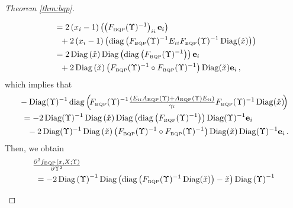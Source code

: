 \documentclass[smallextended]{svjour3hack}       %
\DeclareMathOperator{\Diag}{Diag}
\DeclareMathOperator{\diag}{diag}
\begin{document}
\begin{proof}[Theorem \ref{thm:bqp}]
\begin{itemize}
\begin{align*}
     & ~=2\left(x_i-1\right)\left( \left(F_{{\tiny\mbox{BQP}}}(\Upsilon)^{-1}\right)_{ii} \mathbf{e}_i\right)\\
     & \quad + 2\left(x_i-1\right)\left(\diag\left(F_{{\tiny\mbox{BQP}}}(\Upsilon)^{-1}E_{ii} F_{{\tiny\mbox{BQP}}}(\Upsilon)^{-1}\Diag(\check{x})\right)\right)\\
     & ~=2 \Diag\left(\check{x}\right) \Diag\left(\diag\left(F_{{\tiny\mbox{BQP}}}(\Upsilon)^{-1}\right)\right) \mathbf{e}_i\\
     &  \quad +2 \Diag\left(\check{x}\right)   \left(F_{{\tiny\mbox{BQP}}}(\Upsilon)^{-1}\circ F_{{\tiny\mbox{BQP}}}(\Upsilon)^{-1}\right) \Diag(\check{x}) \mathbf{e}_i\,,
 \end{align*}
    which implies that
    \begin{align*}
    & - \Diag(\Upsilon)^{-1}\diag\left(\!F_{{\tiny\mbox{BQP}}}(\Upsilon)^{-1}\textstyle\frac{\left(E_{ii}A_{{\tiny\mbox{BQP}}}(\Upsilon)+A_{{\tiny\mbox{BQP}}}(\Upsilon) E_{ii}\right)}{\gamma_i}
  F_{{\tiny\mbox{BQP}}}(\Upsilon)^{-1}\Diag(\check{x})\!\right)\\
    & ~=-2 \Diag(\Upsilon)^{-1} \Diag\left(\check{x}\right) \Diag\left(\diag\left(F_{{\tiny\mbox{BQP}}}(\Upsilon)^{-1}\right)\right) \Diag(\Upsilon)^{-1}\mathbf{e}_i \\
    &  \quad - 2 \Diag(\Upsilon)^{-1} \Diag\left(\check{x}\right)   \left(F_{{\tiny\mbox{BQP}}}(\Upsilon)^{-1}\circ F_{{\tiny\mbox{BQP}}}(\Upsilon)^{-1}\right) \Diag(\check{x})\Diag(\Upsilon)^{-1}\mathbf{e}_i\,.
    \end{align*}
   Then, we obtain
    \begin{align*}
        &\textstyle\frac{\partial^2 f_{{\tiny\mbox{BQP}}}\left(x,X;\Upsilon\right)}{\partial \Upsilon ^2 }\\
        &  ~=- 2 \Diag\left(\Upsilon\right)^{-1} \Diag\left(\diag\left(F_{{\tiny\mbox{BQP}}}(\Upsilon)^{-1}\Diag(\check{x})\right)-\check{x}\right) \Diag\left(\Upsilon\right)^{-1}   \\

\end{align*}
\end{itemize}
\end{proof}
\end{document}
